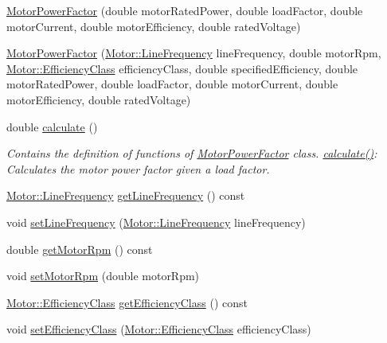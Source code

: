 \begin{DoxyCompactItemize}
\item 
\hyperlink{class_motor_power_factor_a1a2509240f0f759952debf47b7ef3a14}{Motor\+Power\+Factor} (double motor\+Rated\+Power, double load\+Factor, double motor\+Current, double motor\+Efficiency, double rated\+Voltage)
\item 
\hyperlink{class_motor_power_factor_ab48906ae429e7c6f05cebaed14fe2ca1}{Motor\+Power\+Factor} (\hyperlink{class_motor_acee1bdf1b684ad36cb80dc2829d9fcee}{Motor\+::\+Line\+Frequency} line\+Frequency, double motor\+Rpm, \hyperlink{class_motor_afa022971ae062406a9f588c601673d4e}{Motor\+::\+Efficiency\+Class} efficiency\+Class, double specified\+Efficiency, double motor\+Rated\+Power, double load\+Factor, double motor\+Current, double motor\+Efficiency, double rated\+Voltage)
\item 
double \hyperlink{class_motor_power_factor_ac9d5742db4a371bc4e15d5b29d335b6e}{calculate} ()
\begin{DoxyCompactList}\small\item\em Contains the definition of functions of \hyperlink{class_motor_power_factor}{Motor\+Power\+Factor} class. \hyperlink{class_motor_power_factor_ac9d5742db4a371bc4e15d5b29d335b6e}{calculate()}\+: Calculates the motor power factor given a load factor. \end{DoxyCompactList}\item 
\hyperlink{class_motor_acee1bdf1b684ad36cb80dc2829d9fcee}{Motor\+::\+Line\+Frequency} \hyperlink{class_motor_power_factor_aa4cdc420b1f611bcb9f4a69c69c1fabf}{get\+Line\+Frequency} () const
\item 
void \hyperlink{class_motor_power_factor_a5186ccae4191cfc5b2b7c3bdbd166563}{set\+Line\+Frequency} (\hyperlink{class_motor_acee1bdf1b684ad36cb80dc2829d9fcee}{Motor\+::\+Line\+Frequency} line\+Frequency)
\item 
double \hyperlink{class_motor_power_factor_acc7e144fc6c05446141cb0e07be03d70}{get\+Motor\+Rpm} () const
\item 
void \hyperlink{class_motor_power_factor_a4154bf52c6c9c9e5fb2f0985d7ae3531}{set\+Motor\+Rpm} (double motor\+Rpm)
\item 
\hyperlink{class_motor_afa022971ae062406a9f588c601673d4e}{Motor\+::\+Efficiency\+Class} \hyperlink{class_motor_power_factor_a1ce98cb6ae9fbf09b05b4b6bd75e5c71}{get\+Efficiency\+Class} () const
\item 
void \hyperlink{class_motor_power_factor_add3125243d7f11131abc4e1d172ffdfc}{set\+Efficiency\+Class} (\hyperlink{class_motor_afa022971ae062406a9f588c601673d4e}{Motor\+::\+Efficiency\+Class} efficiency\+Class)

\end{DoxyCompactItemize}
